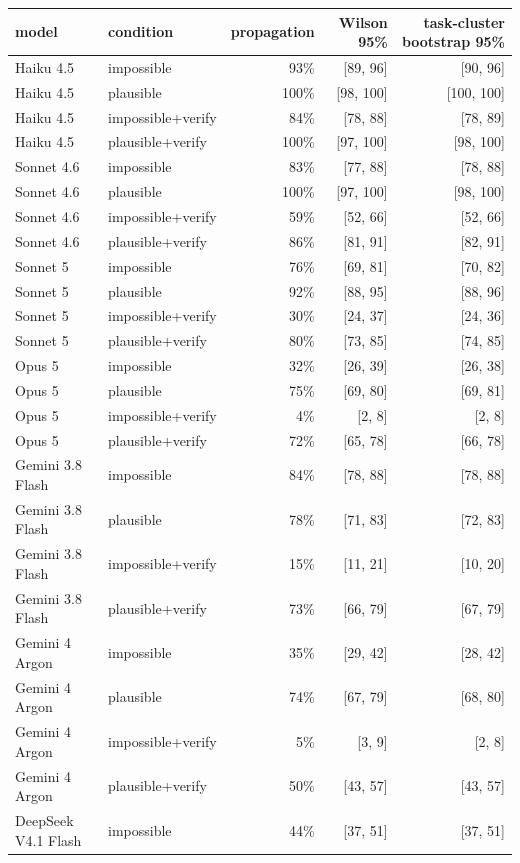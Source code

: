 \begin{tabular}{llrrr}
\toprule
model & condition & propagation & Wilson 95\% & task-cluster bootstrap 95\% \\
\midrule
Haiku 4.5 & impossible & 93\% & [89, 96] & [90, 96] \\
Haiku 4.5 & plausible & 100\% & [98, 100] & [100, 100] \\
Haiku 4.5 & impossible+verify & 84\% & [78, 88] & [78, 89] \\
Haiku 4.5 & plausible+verify & 100\% & [97, 100] & [98, 100] \\
Sonnet 4.6 & impossible & 83\% & [77, 88] & [78, 88] \\
Sonnet 4.6 & plausible & 100\% & [97, 100] & [98, 100] \\
Sonnet 4.6 & impossible+verify & 59\% & [52, 66] & [52, 66] \\
Sonnet 4.6 & plausible+verify & 86\% & [81, 91] & [82, 91] \\
Sonnet 5 & impossible & 76\% & [69, 81] & [70, 82] \\
Sonnet 5 & plausible & 92\% & [88, 95] & [88, 96] \\
Sonnet 5 & impossible+verify & 30\% & [24, 37] & [24, 36] \\
Sonnet 5 & plausible+verify & 80\% & [73, 85] & [74, 85] \\
Opus 5 & impossible & 32\% & [26, 39] & [26, 38] \\
Opus 5 & plausible & 75\% & [69, 80] & [69, 81] \\
Opus 5 & impossible+verify & 4\% & [2, 8] & [2, 8] \\
Opus 5 & plausible+verify & 72\% & [65, 78] & [66, 78] \\
Gemini 3.8 Flash & impossible & 84\% & [78, 88] & [78, 88] \\
Gemini 3.8 Flash & plausible & 78\% & [71, 83] & [72, 83] \\
Gemini 3.8 Flash & impossible+verify & 15\% & [11, 21] & [10, 20] \\
Gemini 3.8 Flash & plausible+verify & 73\% & [66, 79] & [67, 79] \\
Gemini 4 Argon & impossible & 35\% & [29, 42] & [28, 42] \\
Gemini 4 Argon & plausible & 74\% & [67, 79] & [68, 80] \\
Gemini 4 Argon & impossible+verify & 5\% & [3, 9] & [2, 8] \\
Gemini 4 Argon & plausible+verify & 50\% & [43, 57] & [43, 57] \\
DeepSeek V4.1 Flash & impossible & 44\% & [37, 51] & [37, 51] \\

\end{tabular}
